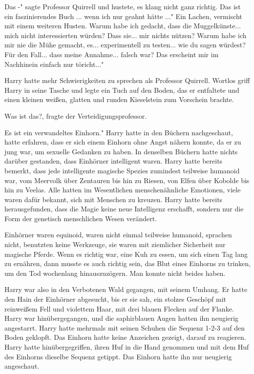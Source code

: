 \glqq{}Das -" sagte Professor Quirrell und hustete, es klang nicht ganz richtig.
\glqq{}Das ist ein faszinierendes Buch ... wenn ich nur geahnt hätte ..." Ein
Lachen, vermischt mit einem weiteren Husten. \glqq{}Warum habe ich gedacht, dass
die Muggelkünste... mich nicht interessierten würden? Dass sie... mir nichts
nützen? Warum habe ich mir nie die Mühe gemacht, es... experimentell zu
testen... wie du sagen würdest? Für den Fall... dass meine Annahme... falsch
war? Das erscheint mir im Nachhinein einfach nur töricht..."

Harry hatte mehr Schwierigkeiten zu sprechen als Professor Quirrell. Wortlos
griff Harry in seine Tasche und legte ein Tuch auf den Boden, das er entfaltete
und einen kleinen weißen, glatten und runden Kieselstein zum Vorschein brachte.

\glqq{}Was ist das?\grqq{}, fragte der Verteidigungsprofessor.

\glqq{}Es ist ein verwandeltes Einhorn." Harry hatte in den Büchern nachgeschaut,
hatte erfahren, dass er sich einem Einhorn ohne Angst nähern konnte, da er zu
jung war, um sexuelle Gedanken zu haben. In denselben Büchern hatte nichts
darüber gestanden, dass Einhörner intelligent waren. Harry hatte bereits
bemerkt, dass jede intelligente magische Spezies zumindest teilweise humanoid
war, vom Meervolk über Zentauren bis hin zu Riesen, von Elfen über Kobolde bis
hin zu Veelas. Alle hatten im Wesentlichen menschenähnliche Emotionen, viele
waren dafür bekannt, sich mit Menschen zu kreuzen. Harry hatte bereits
herausgefunden, dass die Magie keine neue Intelligenz erschafft, sondern nur die
Form der genetisch menschlichen Wesen verändert.

Einhörner waren equinoid, waren nicht einmal teilweise humanoid, sprachen nicht,
benutzten keine Werkzeuge, sie waren mit ziemlicher Sicherheit nur magische
Pferde. Wenn es richtig war, eine Kuh zu essen, um sich einen Tag lang zu
ernähren, dann musste es auch richtig sein, das Blut eines Einhorns zu trinken,
um den Tod wochenlang hinauszuzögern. Man konnte nicht beides haben.

Harry war also in den Verbotenen Wald gegangen, mit seinem Umhang. Er hatte den
Hain der Einhörner abgesucht, bis er sie sah, ein stolzes Geschöpf mit
reinweißem Fell und violettem Haar, mit drei blauen Flecken auf der Flanke.
Harry war hinübergegangen, und die saphirblauen Augen hatten ihn neugierig
angestarrt. Harry hatte mehrmals mit seinen Schuhen die Sequenz 1-2-3 auf den
Boden geklopft. Das Einhorn hatte keine Anzeichen gezeigt, darauf zu reagieren.
Harry hatte hinübergegriffen, ihren Huf in die Hand genommen und mit dem Huf des
Einhorns dieselbe Sequenz getippt. Das Einhorn hatte ihn nur neugierig
angeschaut.


